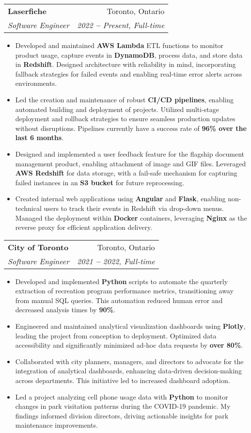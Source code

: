 \documentclass[letterpaper,10pt]{article}
\makeatletter
\newcommand{\resumeItem}[1]{
  \item\small{
    {#1 \vspace{-2pt}}
  }
}
\newcommand{\resumeSubheading}[4]{
  \vspace{-2pt}\item
    \begin{tabular*}{0.97\textwidth}[t]{l@{\extracolsep{\fill}}r}
      \textbf{#1} & #2 \\
      \textit{\small#3} & \textit{\small #4} \\
    \end{tabular*}\vspace{-7pt}
}
\newcommand{\resumeItemListStart}{\begin{itemize}}
\newcommand{\resumeItemListEnd}{\end{itemize}\vspace{-5pt}}
\makeatother
\begin{document}
    \resumeSubheading
      {Laserfiche}{Toronto, Ontario}
      {Software Engineer}{2022 \textbf{--} Present, Full-time}
        \resumeItemListStart
            \resumeItem{Developed and maintained \textbf{AWS Lambda} ETL
            functions to monitor product usage, capture events in
            \textbf{DynamoDB}, process data, and store data in
            \textbf{Redshift}. Designed architecture with reliability in mind,
            incorporating fallback strategies for failed events and enabling
            real-time error alerts across environments.}
            \resumeItem{Led the creation and maintenance of robust
            \textbf{CI/CD pipelines}, enabling automated building and
            deployment of projects. Utilized multi-stage deployment and
            rollback strategies to ensure seamless production updates without
            disruptions. Pipelines currently have a success rate of
            \textbf{96\% over the last 6 months}.}
            \resumeItem{Designed and implemented a user feedback feature for
            the flagship document management product, enabling attachment of
            image and GIF files. Leveraged \textbf{AWS Redshift} for data
            storage, with a fail-safe mechanism for capturing failed instances
            in an \textbf{S3 bucket} for future reprocessing.}
            \resumeItem{Created internal web applications using
            \textbf{Angular} and \textbf{Flask}, enabling non-technical users
            to track their events in Redshift via drop-down menus. Managed the
            deployment within \textbf{Docker} containers, leveraging
            \textbf{Nginx} as the reverse proxy for efficient application
            delivery.}
        \resumeItemListEnd


    \resumeSubheading
      {City of Toronto}{Toronto, Ontario}
      {Software Engineer}{2021 \textbf{--} 2022, Full-time}
        \resumeItemListStart
            \resumeItem{Developed and implemented \textbf{Python} scripts to
            automate the quarterly extraction of recreation program performance
            metrics, transitioning away from manual SQL queries. This
            automation reduced human error and decreased analysis times by
            \textbf{90\%}.}
            \resumeItem{Engineered and maintained analytical visualization
            dashboards using \textbf{Plotly}, leading the project from
            conception to deployment. Optimized data accessibility and
            significantly minimized ad-hoc data requests by \textbf{over
            80\%}.}
            \resumeItem{Collaborated with city planners, managers, and
            directors to advocate for the integration of analytical dashboards,
            enhancing data-driven decision-making across departments. This
            initiative led to increased dashboard adoption.}
            \resumeItem{Led a project analyzing cell phone usage data with
            \textbf{Python} to monitor changes in park visitation patterns
            during the COVID-19 pandemic. My findings informed division
            directors, driving actionable insights for park maintenance
            improvements.}
        \resumeItemListEnd
    
\end{document}
